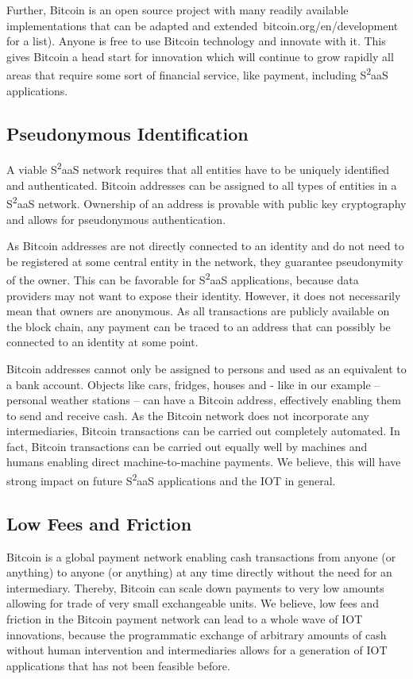 Further, Bitcoin is an open source project with many readily available implementations that can be adapted and extended\ bitcoin.org/en/development for a list). Anyone is free to use Bitcoin technology and innovate with it. This gives Bitcoin a head start for innovation which will continue to grow rapidly all areas that require some sort of financial service, like payment, including S\textsuperscript{2}aaS applications.

\subsection{Pseudonymous Identification}

A viable S\textsuperscript{2}aaS network requires that all entities have  to be  uniquely  identified  and  authenticated. Bitcoin addresses can be assigned to all types of entities in a S\textsuperscript{2}aaS network. Ownership of an address is provable with public key cryptography and allows for pseudonymous authentication.

As Bitcoin addresses are not directly connected to an identity and do not need to be registered at some central entity in the network, they guarantee pseudonymity of the owner. This can be favorable for S\textsuperscript{2}aaS applications, because data providers may not want to expose their identity. However, it does not necessarily mean that owners are anonymous. As all transactions are publicly available on the block chain, any payment can be traced to an address that can possibly be connected to an identity at some point.

Bitcoin addresses cannot only be assigned to persons and used as an equivalent to a bank account. Objects like cars, fridges, houses and - like in our example -- personal weather stations -- can have a Bitcoin address, effectively enabling them to send and receive cash. As the Bitcoin network does not incorporate any intermediaries, Bitcoin transactions can be carried out completely automated. In fact, Bitcoin transactions can be carried out equally well by machines and humans enabling direct machine-to-machine payments. We believe, this will have strong impact on future S\textsuperscript{2}aaS applications and the IOT in general.

\subsection{Low Fees and Friction}

Bitcoin is a global payment network enabling cash transactions from anyone (or anything) to anyone (or anything) at any time directly without the need for an intermediary. Thereby, Bitcoin can scale down payments to very low amounts allowing for trade of very small exchangeable units. We believe, low fees and friction in the Bitcoin payment network can lead to a whole wave of IOT innovations, because the programmatic exchange of arbitrary amounts of cash without human intervention and intermediaries allows for a generation of IOT applications that has not been feasible before.

